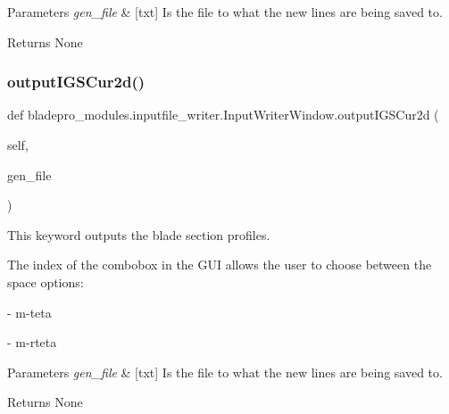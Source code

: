 \begin{DoxyParams}{Parameters}
{\em gen\+\_\+file} & \mbox{[}txt\mbox{]} Is the file to what the new lines are being saved to. \\
\hline
\end{DoxyParams}
\begin{DoxyReturn}{Returns}
None 
\end{DoxyReturn}
\hypertarget{a00073_ace84b07ce1416a3535068da6baa2e7d3}{}\label{a00073_ace84b07ce1416a3535068da6baa2e7d3} 
\subsubsection{\texorpdfstring{output\+I\+G\+S\+Cur2d()}{outputIGSCur2d()}}
{\footnotesize\ttfamily def bladepro\+\_\+modules.\+inputfile\+\_\+writer.\+Input\+Writer\+Window.\+output\+I\+G\+S\+Cur2d (\begin{DoxyParamCaption}\item[{}]{self,  }\item[{}]{gen\+\_\+file }\end{DoxyParamCaption})}



This keyword outputs the blade section profiles. 

The index of the combobox in the G\+UI allows the user to choose between the space options\+:

\begin{DoxyItemize}
\item {} -\/ m\textquotesingle{}-\/teta \item {} -\/ m-\/rteta\end{DoxyItemize}

\begin{DoxyParams}{Parameters}
{\em gen\+\_\+file} & \mbox{[}txt\mbox{]} Is the file to what the new lines are being saved to. \\
\hline
\end{DoxyParams}
\begin{DoxyReturn}{Returns}
None 
\end{DoxyReturn}
\hypertarget{a00073_a394d61e8d66fde036f84746086d6c687}{}\label{a00073_a394d61e8d66fde036f84746086d6c687} 
